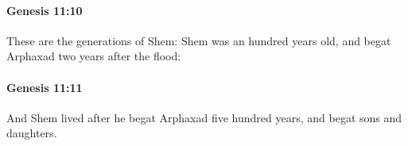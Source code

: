 		\paragraph{Genesis 11:10} %
			\label{GENESIS-11-10}

			These are the generations of Shem: Shem was an hundred years old, and begat Arphaxad two years after the flood:


		\paragraph{Genesis 11:11} %
			\label{GENESIS-11-11}

			And Shem lived after he begat Arphaxad five hundred years, and begat sons and daughters.


